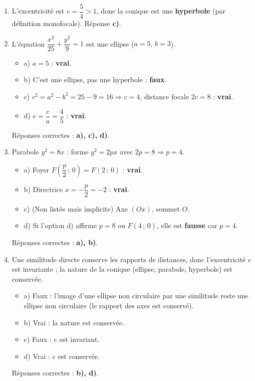\documentclass[11pt]{article}
\begin{document}
\begin{corrige}
\begin{enumerate}
\item L'excentricité est $e = \dfrac{5}{4} > 1$, donc la conique est une \textbf{hyperbole} (par définition monofocale). Réponse \textbf{c)}.
\item L'équation $\dfrac{x^{2}}{25} + \dfrac{y^{2}}{9} = 1$ est une ellipse ($a=5$, $b=3$).
  \begin{itemize}
    \item a) $a = 5$ : \textbf{vrai}.
    \item b) C'est une ellipse, pas une hyperbole : \textbf{faux}.
    \item c) $c^{2} = a^{2} - b^{2} = 25 - 9 = 16 \Rightarrow c = 4$, distance focale $2c = 8$ : \textbf{vrai}.
    \item d) $e = \dfrac{c}{a} = \dfrac{4}{5}$ : \textbf{vrai}.
  \end{itemize}
  Réponses correctes : \textbf{a), c), d)}.
\item Parabole $y^{2} = 8x$ : forme $y^{2} = 2px$ avec $2p = 8 \Rightarrow p = 4$.
  \begin{itemize}
    \item a) Foyer $F\left(\dfrac{p}{2}\,;\,0\right) = F(2\,;\,0)$ : \textbf{vrai}.
    \item b) Directrice $x = -\dfrac{p}{2} = -2$ : \textbf{vrai}.
    \item c) (Non listée mais implicite) Axe $(Ox)$, sommet $O$.
    \item d) Si l'option d) affirme $p=8$ ou $F(4\,;\,0)$, elle est \textbf{fausse} car $p=4$.
  \end{itemize}
  Réponses correctes : \textbf{a), b)}.
\item Une similitude directe conserve les rapports de distances, donc l'excentricité $e$ est invariante ; la nature de la conique (ellipse, parabole, hyperbole) est conservée.
  \begin{itemize}
    \item a) Faux : l'image d'une ellipse non circulaire par une similitude reste une ellipse non circulaire (le rapport des axes est conservé).
    \item b) Vrai : la nature est conservée.
    \item c) Faux : $e$ est invariant.
    \item d) Vrai : $e$ est conservée.
  \end{itemize}
  Réponses correctes : \textbf{b), d)}.
\end{enumerate}
\end{corrige}
\end{document}
